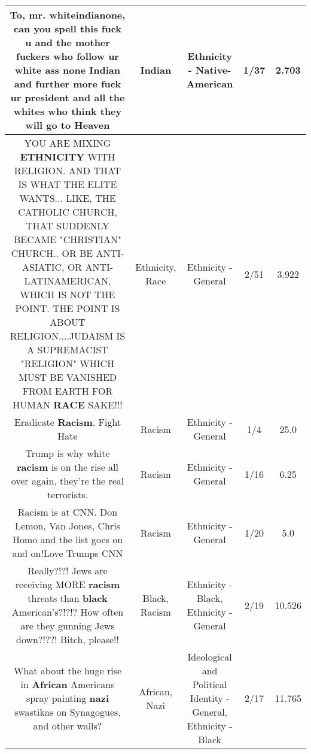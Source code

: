 \documentclass[11pt]{article}
\newlength\mylength
\begin{document}
\begin{center}
\begin{longtable}{|C{.65\mylength}|C{.30\mylength}|C{.12\mylength}|C{.12\mylength}|C{.12\mylength}|}
  \small To, mr. whiteindianone, can you spell this fuck u and the mother fuckers who follow ur white ass none \textbf{Indian} and further more fuck ur president and all the whites who think they will go to Heaven\normalsize   & Indian & Ethnicity - Native-American & 1/37 & 2.703 \\  \hline
  \small YOU ARE MIXING \textbf{ETHNICITY} WITH RELIGION. AND THAT IS WHAT THE ELITE WANTS... LIKE, THE CATHOLIC CHURCH, THAT SUDDENLY BECAME "CHRISTIAN" CHURCH.. OR BE ANTI-ASIATIC, OR ANTI-LATINAMERICAN, WHICH IS NOT THE POINT. THE POINT IS ABOUT RELIGION....JUDAISM IS A SUPREMACIST "RELIGION" WHICH MUST BE VANISHED FROM EARTH  FOR HUMAN \textbf{RACE} SAKE!!!\normalsize   & Ethnicity, Race & Ethnicity - General & 2/51 & 3.922 \\  \hline
  \small Eradicate \textbf{Racism}. Fight Hate\normalsize   & Racism & Ethnicity - General & 1/4 & 25.0 \\  \hline
  \small Trump is why white \textbf{racism} is on the rise all over again, they're the real terrorists.\normalsize   & Racism & Ethnicity - General & 1/16 & 6.25 \\  \hline
  \small Racism is at CNN. Don Lemon, Van Jones, Chris Homo and the list goes on and on!Love Trumps CNN\normalsize   & Racism & Ethnicity - General & 1/20 & 5.0 \\  \hline
  \small Really?!?! Jews are receiving MORE \textbf{racism} threats than \textbf{black} American's?!?!? How often are they gunning Jews down?!??! Bitch, please!!\normalsize   & Black, Racism & Ethnicity - Black, Ethnicity - General & 2/19 & 10.526 \\  \hline
  \small What about the huge rise in \textbf{African} Americans spray painting \textbf{nazi} swastikas on Synagogues, and other walls?\normalsize   & African, Nazi &  Ideological and Political Identity - General, Ethnicity - Black & 2/17 & 11.765 \\  \hline

\end{longtable}
\end{center}
\end{document}

